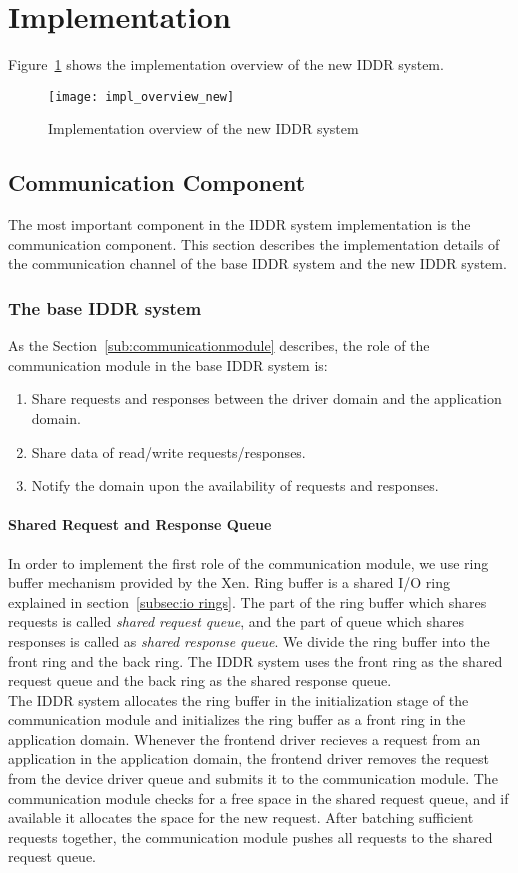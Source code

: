 \section{Implementation}

Figure~\ref{fig:Implementation overview} shows the implementation overview of the new IDDR system.

\begin{figure}[!ht]
\centering
\texttt{[image: impl\_overview\_new]}
\caption{Implementation overview of the new IDDR system}
\label{fig:Implementation overview}
\end{figure}

\subsection{Communication Component}
The most important component in the IDDR system implementation is the communication component. This section describes the implementation details of the communication channel of the base IDDR system and the new IDDR system. 
\subsubsection*{The base IDDR system}
As the Section~\ref{sub:communicationmodule} describes, the role of the communication module in the base IDDR system is:
\begin{enumerate} 
\item Share requests and responses between the driver domain and the application domain.
\item Share data of read/write requests/responses.
\item Notify the domain upon the availability of requests and responses. 
\end{enumerate}
\paragraph{Shared Request and Response Queue}
In order to implement the first role of the communication module, we use ring buffer mechanism provided by the Xen. Ring buffer is a shared I/O ring explained in section~\ref{subsec:io rings}. The part of the ring buffer which shares requests is called \textit{shared request queue}, and the part of queue which shares responses is called as \textit{shared response queue}. We divide the ring buffer into the front ring and the back ring. The IDDR system uses the front ring as the shared request queue and the back ring as the shared response queue. 
\\[3mm]
The IDDR system allocates the ring buffer in the initialization stage of the communication module and initializes the ring buffer as a front ring in the application domain. Whenever the frontend driver recieves a request from an application in the application domain, the frontend driver removes the request from the device driver queue and submits it to the communication module. The communication module checks for a free space in the shared request queue, and if available it allocates the space for the new request. After batching sufficient requests together, the communication module pushes all requests to the shared request queue.

